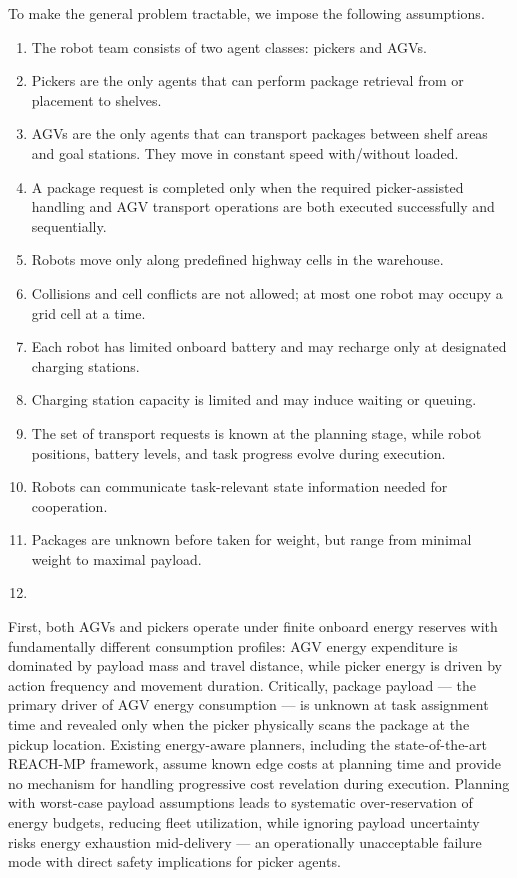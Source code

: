\documentclass[Afour,sageh,times]{sagej}
\begin{document}
To make the general problem tractable, we impose the following assumptions.
\begin{enumerate}
    \item The robot team consists of two agent classes: pickers and AGVs.
    \item Pickers are the only agents that can perform package retrieval from or placement to shelves.
    \item AGVs are the only agents that can transport packages between shelf areas and goal stations. They move in constant speed with/without loaded.
    \item A package request is completed only when the required picker-assisted handling and AGV transport operations are both executed successfully and sequentially.
    \item Robots move only along predefined highway cells in the warehouse.
    \item Collisions and cell conflicts are not allowed; at most one robot may occupy a grid cell at a time.
    \item Each robot has limited onboard battery and may recharge only at designated charging stations.
    \item Charging station capacity is limited and may induce waiting or queuing.
    \item The set of transport requests is known at the planning stage, while robot positions, battery levels, and task progress evolve during execution.
    \item Robots can communicate task-relevant state information needed for cooperation.
    \item Packages are unknown before taken for weight, but range from minimal weight to maximal payload.
    \item 
\end{enumerate}

First, both AGVs and pickers operate under finite onboard energy reserves with fundamentally different consumption profiles: AGV energy expenditure is dominated by payload mass and travel distance, while picker energy is driven by action frequency and movement duration. Critically, package payload — the primary driver of AGV energy consumption — is unknown at task assignment time and revealed only when the picker physically scans the package at the pickup location. Existing energy-aware planners, including the state-of-the-art REACH-MP framework, assume known edge costs at planning time and provide no mechanism for handling progressive cost revelation during execution. Planning with worst-case payload assumptions leads to systematic over-reservation of energy budgets, reducing fleet utilization, while ignoring payload uncertainty risks energy exhaustion mid-delivery — an operationally unacceptable failure mode with direct safety implications for picker agents.
\end{document}
